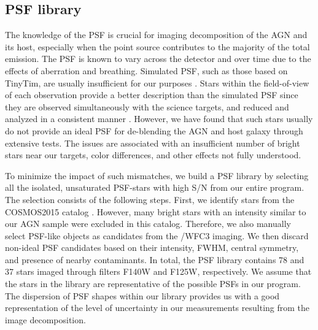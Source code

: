 \documentclass[apj]{emulateapj}
\begin{document}
\subsection{PSF library}
\label{sec:psf_library}

The knowledge of the PSF is crucial for imaging decomposition of the AGN and its host, especially when the point source contributes to the majority of the total emission. The PSF is known to vary across the detector and over time due to the effects of aberration and breathing. Simulated PSF, such as those based on {\sc TinyTim}, are usually insufficient for our purposes \citep{Mechtley2012}. Stars within the field-of-view of each observation provide a better description than the simulated PSF since they are observed simultaneously with the science targets, and reduced and analyzed in a consistent manner \citet{Kim2008, Park15}. However, we have found that such stars usually do not provide an ideal PSF for de-blending the AGN and host galaxy through extensive tests. The issues are associated with an insufficient number of bright stars near our targets, color differences, and other effects not fully understood.

To minimize the impact of such mismatches, we build a PSF library by selecting all the isolated, unsaturated PSF-stars with high S/N from our entire program. The selection consists of the following steps. First, we identify stars from the COSMOS2015 catalog \citep{Laigle2016}. However, many bright stars with an intensity similar to our AGN sample were excluded in this catalog. Therefore, we also manually select PSF-like objects as candidates from the \hst/WFC3 imaging. We then discard non-ideal PSF candidates based on their intensity, FWHM, central symmetry, and presence of nearby contaminants. In total, the PSF library contains 78 and 37 stars imaged through filters F140W and F125W, respectively. We assume that the stars in the library are representative of the possible PSFs in our program. The dispersion of PSF shapes within our library provides us with a good representation of the level of uncertainty in our measurements resulting from the image decomposition.
\end{document}

